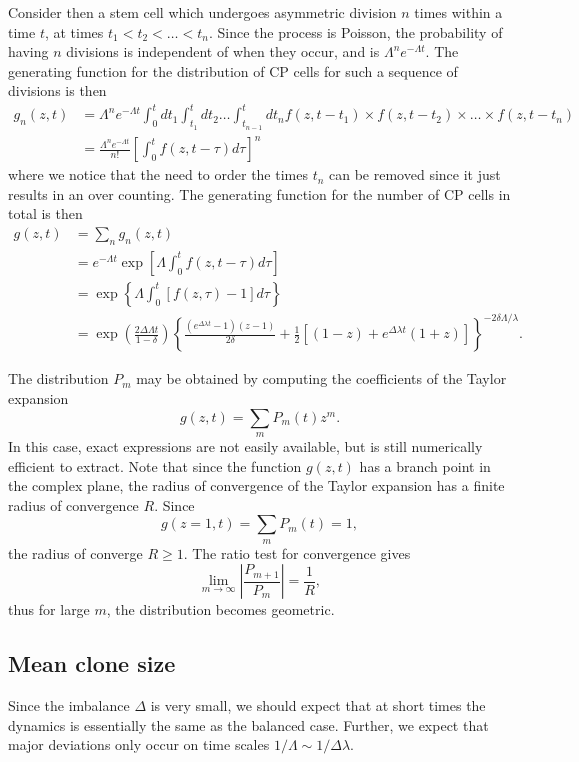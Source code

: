 \documentclass[10pt,UKenglish]{article}
\begin{document}
Consider then a stem cell which undergoes asymmetric division $n$ times within a time $t$, at times $t_1 < t_2 < \ldots < t_n$. Since the process is Poisson, the probability of having $n$ divisions is independent of when they occur, and is $\Lambda^n e^{-\Lambda t}$. The generating function for the distribution of CP cells for such a sequence of divisions is then
\begin{align*}
g_n(z,t) &= \Lambda^n e^{-\Lambda t} \int_0^t dt_1 \int_{t_1}^t dt_2 \ldots \int_{t_{n-1}}^t dt_n f(z,t-t_1) \times f(z,t-t_2) \times \ldots \times f(z,t-t_n) \\
 &= \frac{\Lambda^n e^{-\Lambda t}}{n!} \left[\int_0^t f(z,t-\tau) d\tau \right]^n
\end{align*}
where we notice that the need to order the times $t_n$ can be removed since it just results in an over counting. The generating function for the number of CP cells in total is then
\begin{align*}
g(z,t) &= \sum_n g_n(z,t) \\
 &= e^{-\Lambda t} \exp\left[\Lambda \int_0^t f(z,t-\tau) d\tau \right] \\
 &= \exp\left\{\Lambda \int_0^t \left[f(z,\tau) - 1\right] d\tau \right\} \\
 &= \exp\left(\frac{2 \Delta \Lambda t}{1-\delta}\right) \left\{ \frac{\left(e^{\Delta \lambda t}-1 \right)(z-1)}{2\delta} + \frac{1}{2}\left[(1-z) + e^{\Delta \lambda t}(1+z) \right]\right\}^{-2\delta\Lambda/\lambda}.
\end{align*}

The distribution $P_m$ may be obtained by computing the coefficients of the Taylor expansion $$g(z,t) = \sum_m P_m(t) z^m.$$ In this case, exact expressions are not easily available, but is still numerically efficient to extract. Note that since the function $g(z,t)$ has a branch point in the complex plane, the radius of convergence of the Taylor expansion has a finite radius of convergence $R$. Since $$g(z=1,t) = \sum_m P_m(t) = 1,$$ the radius of converge $R \ge 1$. The ratio test for convergence gives $$\lim_{m\rightarrow \infty} \left| \frac{P_{m+1}}{P_m} \right| = \frac{1}{R},$$ thus for large $m$, the distribution becomes geometric.

\subsection{Mean clone size}

Since the imbalance $\Delta$ is very small, we should expect that at short times the dynamics is essentially the same as the balanced case. Further, we expect that major deviations only occur on time scales $1/\Lambda \sim 1/\Delta \lambda$.
\end{document}
